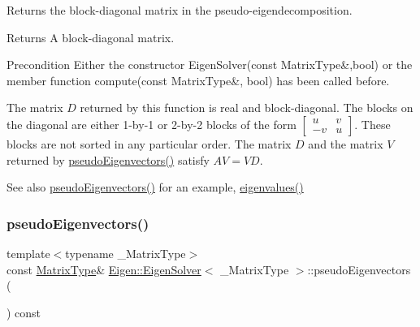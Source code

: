 Returns the block-\/diagonal matrix in the pseudo-\/eigendecomposition. 

\begin{DoxyReturn}{Returns}
A block-\/diagonal matrix.
\end{DoxyReturn}
\begin{DoxyPrecond}{Precondition}
Either the constructor Eigen\+Solver(const Matrix\+Type\&,bool) or the member function compute(const Matrix\+Type\&, bool) has been called before.
\end{DoxyPrecond}
The matrix $ D $ returned by this function is real and block-\/diagonal. The blocks on the diagonal are either 1-\/by-\/1 or 2-\/by-\/2 blocks of the form $ \begin{bmatrix} u & v \\ -v & u \end{bmatrix} $. These blocks are not sorted in any particular order. The matrix $ D $ and the matrix $ V $ returned by \mbox{\hyperlink{class_eigen_1_1_eigen_solver_a4e796226f06e1f7347cf03a38755a155}{pseudo\+Eigenvectors()}} satisfy $ AV = VD $.

\begin{DoxySeeAlso}{See also}
\mbox{\hyperlink{class_eigen_1_1_eigen_solver_a4e796226f06e1f7347cf03a38755a155}{pseudo\+Eigenvectors()}} for an example, \mbox{\hyperlink{class_eigen_1_1_eigen_solver_a114189009e42f5e03372a7a3dfa33b97}{eigenvalues()}} 
\end{DoxySeeAlso}
\mbox{\label{class_eigen_1_1_eigen_solver_a4e796226f06e1f7347cf03a38755a155}} 
\subsubsection{\texorpdfstring{pseudoEigenvectors()}{pseudoEigenvectors()}}
{\footnotesize\ttfamily template$<$typename \+\_\+\+Matrix\+Type$>$ \\
const \mbox{\hyperlink{class_eigen_1_1_eigen_solver_a83acd180404ddaac8a678fa65a6b632b}{Matrix\+Type}}\& \mbox{\hyperlink{class_eigen_1_1_eigen_solver}{Eigen\+::\+Eigen\+Solver}}$<$ \+\_\+\+Matrix\+Type $>$\+::pseudo\+Eigenvectors (\begin{DoxyParamCaption}{ }\end{DoxyParamCaption}) const\hspace{0.3cm}{\ttfamily [inline]}}



